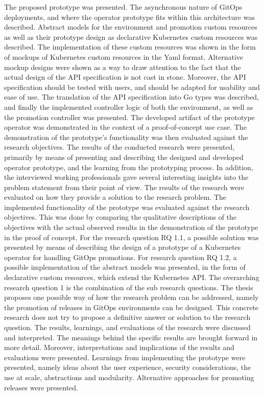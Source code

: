 The proposed prototype was presented.
The asynchronous nature of GitOps deployments, and where
the operator prototype fits within this architecture was described.
Abstract models for the environment and promotion custom resources as well as their prototype
design as declarative Kubernetes custom resources was described.
The implementation of these custom resources was shown in the form of mockups
of Kubernetes custom resources in the Yaml format.
Alternative mockup designs were shown as a way to draw attention to the fact
that the actual design of the API specification is not cast in stone.
Moreover, the API specification should be tested with users,
and should be adapted for usability and ease of use.
The translation of the API specification into Go types was described,
and finally the implemented controller logic of both the environment, as well as
the promotion controller was presented.
The developed artifact of the prototype operator was
demonstrated in the context of a proof-of-concept use case.
The demonstration of the prototype's functionality was then evaluated against
the research objectives.
%
The results of the conducted research were presented, primarily by means of
presenting and describing the designed and developed operator prototype, and the learning
from the prototyping process.
In addition, the interviewed working professionals gave several interesting insights into the problem
statement from their point of view.
The results of the research were evaluated on how they provide a solution to the research problem.
The implemented functionality of the prototype was evaluated against the research objectives.
This was done by comparing the qualitative descriptions of the objectives with the actual observed results
in the demonstration of the prototype in the proof of concept.
For the research question RQ 1.1,
a possible solution was presented by means of
describing the design of a prototype of a Kubernetes operator for handling GitOps promotions.
For research question RQ 1.2,
a possible implementation of the abstract models was presented, in the form of
declarative custom resources, which extend the Kubernetes API.
The overarching research question 1 is the combination of the sub research questions.
The thesis proposes one possible way of how the research problem can be addressed,
namely the promotion of releases in GitOps environments can be designed.
This concrete research does not try to propose a definitive answer or solution to the research question.
%
The results, learnings, and evaluations of the research were discussed and interpreted.
The meanings behind the specific results are brought forward in more detail.
Moreover, interpretations and implications of the results and evaluations were presented.
Learnings from implementing the prototype were presented, namely
ideas about the user experience, security considerations, the use at scale, abstractions and modularity.
Alternative approaches for promoting releases were presented.

